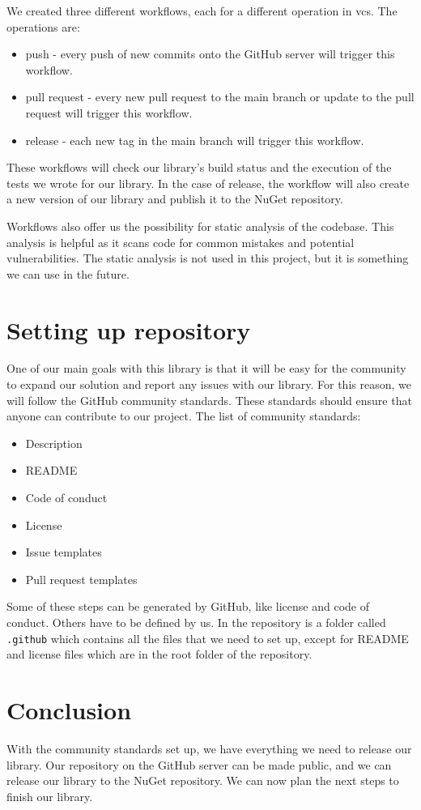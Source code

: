 We created three different workflows, each for a different operation in \acrshort{vcs}. The operations are:
\begin{itemize}
    \item push - every push of new commits onto the GitHub server will trigger this workflow.
    \item pull request - every new pull request to the main branch or update to the pull request will trigger this workflow.
    \item release - each new tag in the main branch will trigger this workflow.
\end{itemize}
These workflows will check our library's build status and the execution of the tests we wrote for our library.
In the case of release, the workflow will also create a new version of our library and publish it to the NuGet repository.

Workflows also offer us the possibility for static analysis of the codebase. This analysis is helpful as it scans code for common mistakes and
potential vulnerabilities. The static analysis is not used in this project, but it is something we can use in the future.

\section{Setting up repository}

One of our main goals with this library is that it will be easy for the community to expand our solution and report any issues with our library.
For this reason, we will follow the GitHub community standards. These standards should ensure that anyone can contribute to our project.
The list of community standards:
\begin{itemize}
    \item {Description}
    \item {README}
    \item {Code of conduct}
    \item {License}
    \item {Issue templates}
    \item {Pull request templates}
\end{itemize}

Some of these steps can be generated by GitHub, like license and code of conduct. Others have to be defined by us. In the repository
is a folder called \texttt{.github} which contains all the files that we need to set up, except for README and license files
which are in the root folder of the repository.

\section{Conclusion}

With the community standards set up, we have everything we need to release our library. Our repository on the GitHub server can be made public, and we
can release our library to the NuGet repository. We can now plan the next steps to finish our library.
